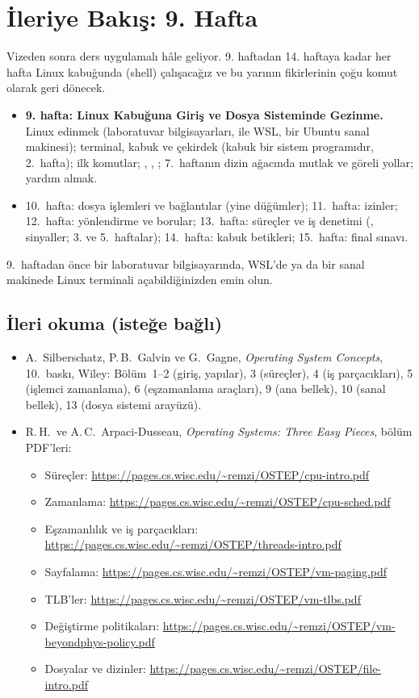 \section{İleriye Bakış: 9. Hafta}
Vizeden sonra ders uygulamalı hâle geliyor. 9. haftadan 14. haftaya kadar her hafta Linux kabuğunda (shell) çalışacağız ve bu yarının fikirlerinin çoğu komut olarak geri dönecek.
\begin{itemize}
  \item \textbf{9. hafta: Linux Kabuğuna Giriş ve Dosya Sisteminde Gezinme.} Linux edinmek (laboratuvar bilgisayarları,  ile WSL, bir Ubuntu sanal makinesi); terminal, kabuk ve çekirdek (kabuk bir sistem programıdır, 2.~hafta); ilk komutlar; , , ; 7.~haftanın dizin ağacında mutlak ve göreli yollar; yardım almak.
  \item 10.~hafta: dosya işlemleri ve bağlantılar (yine düğümler); 11.~hafta: izinler; 12.~hafta: yönlendirme ve borular; 13.~hafta: süreçler ve iş denetimi (, sinyaller; 3. ve 5.~haftalar); 14.~hafta: kabuk betikleri; 15.~hafta: final sınavı.
\end{itemize}
9.~haftadan önce bir laboratuvar bilgisayarında, WSL'de ya da bir sanal makinede Linux terminali açabildiğinizden emin olun.

\subsection*{İleri okuma (isteğe bağlı)}
\begin{itemize}
  \item A.\ Silberschatz, P.\,B.\ Galvin ve G.\ Gagne, \emph{Operating System Concepts}, 10.\ baskı, Wiley: Bölüm~1--2 (giriş, yapılar), 3 (süreçler), 4 (iş parçacıkları), 5 (işlemci zamanlama), 6 (eşzamanlama araçları), 9 (ana bellek), 10 (sanal bellek), 13 (dosya sistemi arayüzü).
  \item R.\,H.\ ve A.\,C.\ Arpaci-Dusseau, \emph{Operating Systems: Three Easy Pieces}, bölüm PDF'leri:
  \begin{itemize}[itemsep=0em]
    \item Süreçler: \url{https://pages.cs.wisc.edu/~remzi/OSTEP/cpu-intro.pdf}
    \item Zamanlama: \url{https://pages.cs.wisc.edu/~remzi/OSTEP/cpu-sched.pdf}
    \item Eşzamanlılık ve iş parçacıkları: \url{https://pages.cs.wisc.edu/~remzi/OSTEP/threads-intro.pdf}
    \item Sayfalama: \url{https://pages.cs.wisc.edu/~remzi/OSTEP/vm-paging.pdf}
    \item TLB'ler: \url{https://pages.cs.wisc.edu/~remzi/OSTEP/vm-tlbs.pdf}
    \item Değiştirme politikaları: \url{https://pages.cs.wisc.edu/~remzi/OSTEP/vm-beyondphys-policy.pdf}
    \item Dosyalar ve dizinler: \url{https://pages.cs.wisc.edu/~remzi/OSTEP/file-intro.pdf}
  \end{itemize}
\end{itemize}
